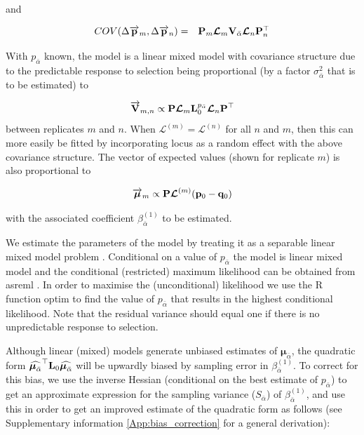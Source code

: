 \documentclass[12pt]{article}
\begin{document}
\begin{bibunit}
and 

\begin{equation} 
\begin{array}{rl}
COV(\Delta \overrightarrow{\bf p}_m, \Delta \overrightarrow{\bf p}_n) = &
{\bf P}_{m}\boldsymbol{\mathcal{L}}_m{\bf V}_{\bar{\alpha}}
\boldsymbol{\mathcal{L}}_n{\bf P}^{\top}_{n}
\end{array}
\end{equation}

With $p_{\bar{\alpha}}$ known, the model is a linear mixed model with covariance structure due to the predictable response to selection being proportional (by a factor $\sigma^2_{\bar{\alpha}}$ that is to be estimated) to

\begin{equation} 
\overrightarrow{\bf V}_{m,n} \propto {\bf P}\boldsymbol{\mathcal{L}}_m{\bf L}_{0}^{p_{\bar{\alpha}}}
\boldsymbol{\mathcal{L}}_n{\bf P}^{\top}
\end{equation}
between replicates $m$ and $n$. When $\boldsymbol{\mathcal{L}}^{(m)}=\boldsymbol{\mathcal{L}}^{(n)}$ for all $n$ and $m$, then this can more easily be fitted by incorporating locus as a random effect with the above covariance structure. The vector of expected values (shown for replicate $m$) is also proportional to  

\begin{equation} 
\overrightarrow{\boldsymbol \mu}_m \propto {\bf P}\boldsymbol{\mathcal{L}}^{(m)}({\bf p}_{0}-{\bf q}_{0})
\end{equation}

with the associated coefficient $\beta^{(1)}_{\bar{\alpha}}$ to be estimated. 

We estimate the parameters of the model by treating it as a separable linear mixed model problem
\citep{richards1961method}. Conditional on a value of ${p_{\bar{\alpha}}}$ the model is linear mixed model and the conditional (restricted) maximum likelihood can be obtained from asreml \citep{Butler.2023}. In order to maximise the (unconditional) likelihood we use the R function optim to find the value of  ${p_{\bar{\alpha}}}$ that results in the highest conditional likelihood. Note that the residual variance should equal one if there is no unpredictable response to selection. 

Although linear (mixed) models generate unbiased estimates of $\boldsymbol{\mu}_{\bar{\alpha}}$, the quadratic form $\widehat{\boldsymbol{\mu}_{\bar{\alpha}}}^{\top}{\bf L}_0\widehat{\boldsymbol{\mu}_{\bar{\alpha}}}$ will be upwardly biased by sampling error in $\beta^{(1)}_{\bar{\alpha}}$. To correct for this bias, we use the inverse Hessian (conditional on the best estimate of ${p_{\bar{\alpha}}}$) to get an approximate expression for the sampling variance  ($S_{\bar{\alpha}}$) of $\beta^{(1)}_{\bar{\alpha}}$, and use this in order to get an improved estimate of the quadratic form as follows (see Supplementary information \ref{App:bias_correction} for a general derivation):


\end{bibunit}
\end{document}
